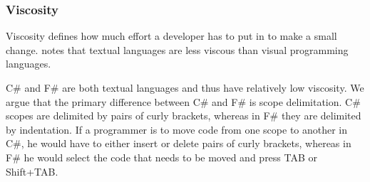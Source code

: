 \subsubsection{Viscosity}
Viscosity defines how much effort a developer has to put in to make a small change. \cite{green1996usability} notes that textual languages are less viscous than visual programming languages.

C\# and F\# are both textual languages and thus have relatively low viscosity. We argue that the primary difference between C\# and F\# is scope delimitation. C\# scopes are delimited by pairs of curly brackets, whereas in F\# they are delimited by indentation. If a programmer is to move code from one scope to another in C\#, he would have to either insert or delete pairs of curly brackets, whereas in F\# he would select the code that needs to be moved and press TAB or Shift+TAB.